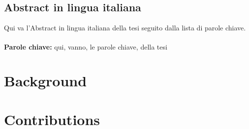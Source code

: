 \documentclass{Configuration_Files/PoliMi3i_thesis}
\begin{document}
\chapter*{Abstract in lingua italiana}
Qui va l'Abstract in lingua italiana della tesi seguito dalla lista di parole chiave.
\\
\\
\textbf{Parole chiave:} qui, vanno, le parole chiave, della tesi %


\thispagestyle{empty}
\tableofcontents %
\thispagestyle{empty}
\cleardoublepage





\mainmatter %




\part{Background}\label{part:background}




\part{Contributions}\label{part:contributions}





\end{document}
